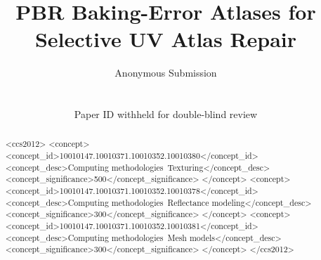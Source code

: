 \documentclass{egPublStyle-PG2026/egpubl}
\title[PBR Baking-Error Atlases]%
      {PBR Baking-Error Atlases for Selective UV Atlas Repair}
\author[Anonymous Submission]%
{\parbox{\textwidth}{\centering Anonymous Submission}
\\
{\parbox{\textwidth}{\centering Paper ID withheld for double-blind review}}}
\begin{document}
\maketitle

\begin{abstract}

\begin{CCSXML}
<ccs2012>
<concept>
<concept_id>10010147.10010371.10010352.10010380</concept_id>
<concept_desc>Computing methodologies~Texturing</concept_desc>
<concept_significance>500</concept_significance>
</concept>
<concept>
<concept_id>10010147.10010371.10010352.10010378</concept_id>
<concept_desc>Computing methodologies~Reflectance modeling</concept_desc>
<concept_significance>300</concept_significance>
</concept>
<concept>
<concept_id>10010147.10010371.10010352.10010381</concept_id>
<concept_desc>Computing methodologies~Mesh models</concept_desc>
<concept_significance>300</concept_significance>
</concept>
</ccs2012>
\end{CCSXML}
\printccsdesc
\end{abstract}









\appendix




\end{document}
